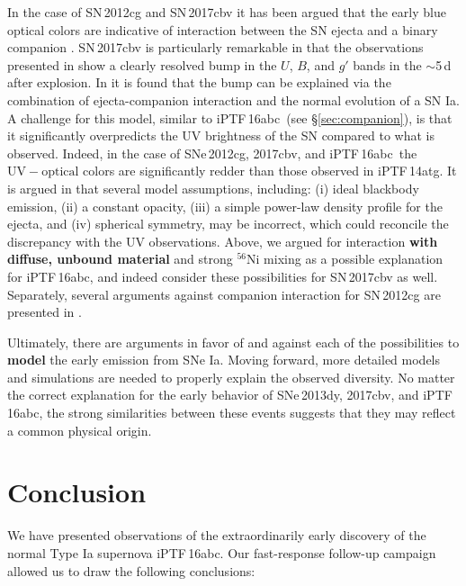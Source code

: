 \documentclass[twocolumn]{aastex61}
\newcommand{\abc}{iPTF\,16abc}
\begin{document}
In the case of SN\,2012cg and SN\,2017cbv it has been argued that the early
blue optical colors are indicative of interaction between the SN ejecta and a
binary companion \citep{2016ApJ...820...92M,2017ApJ...845L..11H}. SN\,2017cbv
is particularly remarkable in that the observations presented in
\citet{2017ApJ...845L..11H} show a clearly resolved bump in the $U$, $B$, and
$g'$ bands in the $\sim$5\,d after explosion. In
\citeauthor{2017ApJ...845L..11H} it is found that the bump can be explained
via the combination of ejecta-companion interaction and the normal evolution
of a SN Ia. A challenge for this model, similar to \abc\ (see
\S\ref{sec:companion}), is that it significantly overpredicts the UV
brightness of the SN compared to what is observed. Indeed, in the case of
SNe\,2012cg, 2017cbv, and \abc\ the $\mathrm{UV} - \mathrm{optical}$ colors
are significantly redder than those observed in iPTF\,14atg. It is argued in
\citet{2017ApJ...845L..11H} that several model assumptions, including: (i)
ideal blackbody emission, (ii) a constant opacity, (iii) a simple power-law
density profile for the ejecta, and (iv) spherical symmetry, may be incorrect,
which could reconcile the discrepancy with the UV observations. Above, we
argued for interaction \textbf{with diffuse, unbound material} and strong
$^{56}$Ni mixing as a possible explanation for \abc, and indeed
\citet{2017ApJ...845L..11H} consider these possibilities for SN\,2017cbv as
well. Separately, several arguments against companion interaction for
SN\,2012cg are presented in \citet{2016arXiv161007601S}.

Ultimately, there are arguments in favor of and against each of the
possibilities to \textbf{model} the early emission from SNe Ia. Moving
forward, more detailed models and simulations are needed to properly explain
the observed diversity. No matter the correct explanation for the early
behavior of SNe\,2013dy, 2017cbv, and \abc, the strong similarities between
these events suggests that they may reflect a common physical origin.

\section{Conclusion}
\label{sec:conclusion}

We have presented observations of the extraordinarily early discovery of the 
normal Type Ia supernova \abc. Our fast-response follow-up 
campaign allowed us to draw the following conclusions:
\end{document}
